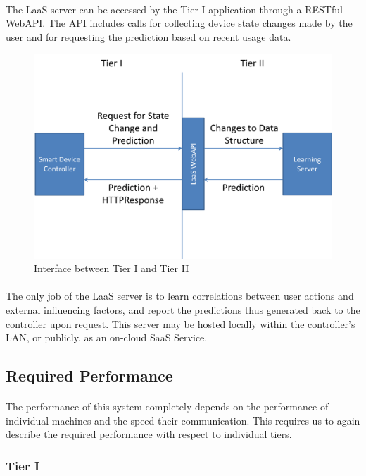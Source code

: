	\paragraph{}
	The LaaS server can be accessed by the Tier I application through a RESTful WebAPI. The API includes calls for collecting device state changes made by the user and for requesting the prediction based on recent usage data.
	\begin{figure}[H]
		\includegraphics[width=\textwidth]{./Chapter3/t1-t2}
			\caption{Interface between Tier I and Tier II}
	\end{figure}
	\paragraph{}
	The only job of the LaaS server is to learn correlations between user actions and external influencing factors, and report the predictions thus generated back to the controller upon request. This server may be hosted locally within the controller's LAN, or publicly, as an on-cloud SaaS Service.

\pagebreak
\subsection{Required Performance}
\paragraph{}
The performance of this system completely depends on the performance of individual machines and the speed their communication. This requires us to again describe the required performance with respect to individual tiers.
\subsubsection*{Tier I}
